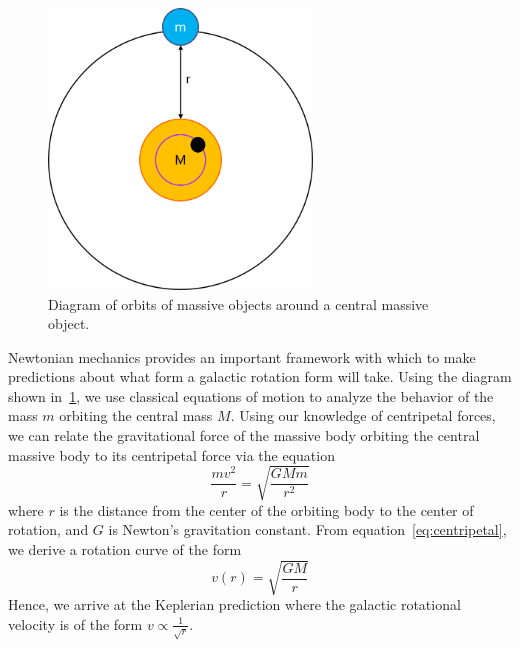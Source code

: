 \documentclass[aps,twocolumn,secnumarabic,balancelastpage,amsmath,amssymb,nofootinbib, floatfix]{revtex4-2}
\begin{document}
	\begin{figure}
		\includegraphics[width=7cm]{orbit_diagram.png}
		\caption{Diagram of orbits of massive objects around a central massive object.}
		\label{fig:orbit}
	\end{figure}
 	Newtonian mechanics provides an important framework with which to make predictions about what form a galactic rotation form will take. Using the diagram shown in~\ref{fig:orbit}, we use classical equations of motion to analyze the behavior of the mass $m$ orbiting the central mass $M$. Using our knowledge of centripetal forces, we can relate the gravitational force of the massive body orbiting the central massive body to its centripetal force via the equation
 	\begin{equation}
 		\frac{mv^{2}}{r}=\sqrt{\frac{GMm}{r^{2}}}
 		\label{eq:centripetal}
 	\end{equation} 
 	where $r$ is the distance from the center of the orbiting body to the center of rotation, and $G$ is Newton's gravitation constant. From equation~\ref{eq:centripetal}, we derive a rotation curve of the form
 	\begin{equation}
 		v(r)=\sqrt{\frac{GM}{r}}
 		\label{eq:keplerian}
 	\end{equation}
 	Hence, we arrive at the Keplerian prediction where the galactic rotational velocity is of the form $v\propto\frac{1}{\sqrt{r}}$. 
 	
\end{document}
